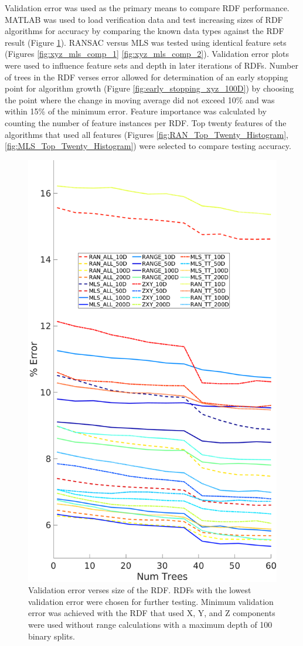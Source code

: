 \documentclass[numbered,pdftex]{ohio-etd}
\begin{document}
{		{Validation error was used as the primary means to compare RDF performance. MATLAB was used to load verification data and test increasing sizes of RDF algorithms for accuracy by comparing the known data types against the RDF result (Figure \ref{fig:moving_average_error_all}). RANSAC versus MLS was tested using identical feature sets (Figures \ref{fig:xyz_mls_comp_1} \ref{fig:xyz_mls_comp_2}). Validation error plots were used to influence feature sets and depth in later iterations of RDFs. Number of trees in the RDF verses error allowed for determination of an early stopping point for algorithm growth (Figure \ref{fig:early_stopping_xyz_100D}) by choosing the point where the change in moving average did not exceed 10\% and was within 15\% of the minimum error. Feature importance was calculated by counting the number of feature instances per RDF. Top twenty features of the algorithms that used all features (Figures \ref{fig:RAN_Top_Twenty_Histogram}, \ref{fig:MLS_Top_Twenty_Histogram}) were selected to compare testing accuracy. }
		
		\begin{figure}[H]
			\centering
			\includegraphics[width=0.7\linewidth]{Defense_Images/All_Vali_Error_3}
			\caption[Validation Error vs RDF Size]{Validation error verses size of the RDF. RDFs with the lowest validation error were chosen for further testing. Minimum validation error was achieved with the RDF that used X, Y, and Z components were used without range calculations with a maximum depth of 100 binary splits.}
			\label{fig:moving_average_error_all}
		\end{figure}
	
}
\end{document}
